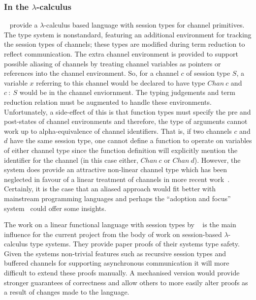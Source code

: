\documentclass{mprop}
\begin{document}
\subsubsection{In the $\lambda$-calculus}\label{sec:lam}

\citeauthor{Gay:2008:STI}~\cite{Gay:2008:STI} provide a $\lambda$-calculus based language with session types for channel primitives. The type system is nonstandard, featuring an additional environment for tracking the session types of channels; these types are modified during term reduction to reflect communication. The extra channel environment is provided to support possible aliasing of channels by treating channel variables as pointers or references into the channel environment. So, for a channel $c$ of session type $S$, a variable $x$ referring to this channel would be declared to have type $Chan~c$ and $c~:~S$ would be in the channel enviornment. The typing judgements and term reduction relation must be augmented to handle these environments. Unfortunately, a side-effect of this is that function types must specify the pre and post-states of channel environments and therefore, the type of arguments cannot work up to alpha-equivalence of channel identifiers. That is, if two channels $c$ and $d$ have the same session type, one cannot define a function to operate on variables of either channel type since the function definition will explicitly mention the identifier for the channel (in this case either, $Chan~c$ or $Chan~d$). However, the system does provide an attractive non-linear channel type which has been neglected in favour of a linear treatment of channels in more recent work~\cite{Gay:2010:LAST,Mazurak:2010:LCC,Wadler:2012}. Certainly, it is the case that an aliased approach would fit better with mainstream programming languages and perhaps the ``adoption and focus'' system~\cite{Fahndrich:2002} could offer some insights.

The work on a linear functional language with session types by \citeauthor{Gay:2010:LAST}~\cite{Gay:2010:LAST} is the main influence for the current project from the body of work on session-based $\lambda$-calculus type systems. They provide paper proofs of their systems type safety. Given the systems non-trivial features such as recursive session types and buffered channels for supporting asynchronous communication it will more difficult to extend these proofs manually. A mechanised version would provide stronger guarantees of correctness and allow others to more easily alter proofs as a result of changes made to the language.
\end{document}
